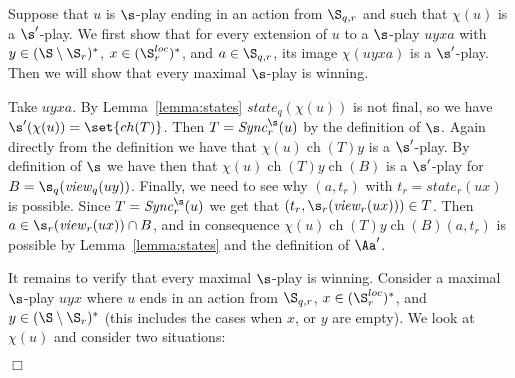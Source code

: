 \documentclass{llncs}
\newcommand{\Sync}{\mathit{Sync}}
\newcommand{\state}{\mathit{state}}
\newcommand{\view}{\mathit{view}}
\newcommand{\ch}{\mathop{ch}}
\renewenvironment{proof}{{\em Proof. }}{\nopagebreak
  \hspace*{\fill}$\Box$}
\begin{document}
\begin{proof}
  Suppose that $u$ is $\s$-play ending in an action from
  $\S_{q,r}$ and such that $\chi(u)$ is a $\s'$-play. We first show
  that for every extension of $u$ to a $\s$-play $uyxa$ with $y\in
  (\S \setminus \S_r)^*$, $x\in(\S^{loc}_r)^*$, and $a\in \S_{q,r}$, its image
  $\chi(uyxa)$ is a $\s'$-play. Then we will show that
  every maximal $\s$-play is winning.

  Take $uyxa$. By Lemma~\ref{lemma:states} $\state_q(\chi(u))$ is not
  final, so we have $\s'(\chi(u))=\set{\ch(T)}$. Then
  $T=\Sync^\s_r(u)$ by the definition of $\s$. Again directly from the
  definition we have that $\chi(u)\ch(T)y$ is a $\s'$-play. By
  definition of $\s$ we have then that $\chi(u)\ch(T)y\ch(B)$ is a
  $\s'$-play for $B=\s_q(\view_q(uy))$. Finally, we need to see why
  $(a,t_r)$ with $t_r=\state_r(ux)$ is possible. Since
  $T=\Sync^\s_r(u)$ we get that $(t_r,\s_r(\view_r(ux)))\in T$. Then
  $a\in\s_r(\view_r(ux))\cap B$, and in consequence
  $\chi(u)\ch(T)y\ch(B)(a,t_r)$ is possible by
  Lemma~\ref{lemma:states} and the definition of $\Aa'$.

  It remains to verify that every maximal $\s$-play is winning. Consider a
  maximal $\s$-play $uyx$ where $u$ ends in an action from $\S_{q,r}$,
  $x\in(\S^{loc}_r)^*$, and $y\in(\S \setminus\S_r)^*$ (this includes the cases
  when $x$, or $y$ are empty). We look at $\chi(u)$ and consider two
  situations:


\end{proof}
\end{document}
